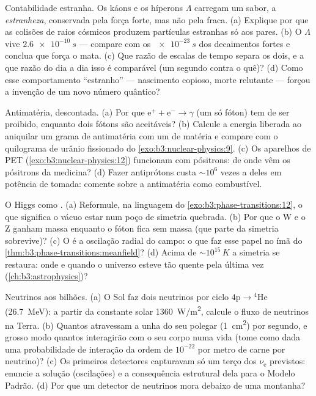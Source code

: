 \begin{exercise}[$\star\star$]\label{exo:b3:particle-physics:7}
Contabilidade estranha. Os káons e os híperons $\Lambda$ carregam um
sabor, a \emph{estranheza}, conservada pela força forte, mas
não pela fraca. (a) Explique por que as colisões de raios cósmicos
produzem partículas estranhas só aos pares. (b) O $\Lambda$ vive
$\qty{2.6e-10}{s}$ --- compare com os $\qty{e-23}{s}$ dos
decaimentos fortes e conclua que força o mata. (c) Que razão
de escalas de tempo separa os dois, e a que razão do dia a dia
isso é comparável (um segundo contra o quê)? (d) Como esse
comportamento ``estranho'' --- nascimento copioso, morte relutante ---
forçou a invenção de um novo número quântico?
\end{exercise}

\begin{exercise}[$\star\star$]\label{exo:b3:particle-physics:8}
Antimatéria, descontada. (a) Por que
$\text{e}^+ + \text{e}^- \to \gamma$ (um só fóton) tem de ser proibido,
enquanto dois fótons são aceitáveis? (b) Calcule a energia liberada ao
aniquilar um grama de antimatéria com um de matéria e
compare com o quilograma de urânio fissionado do
\cref{exo:b3:nuclear-physics:9}. (c) Os aparelhos de PET
(\cref{exo:b3:nuclear-physics:12}) funcionam com pósitrons: de onde vêm
os pósitrons da medicina? (d) Fazer antiprótons custa
$\sim10^{6}$ vezes a  deles em potência de tomada:
comente sobre a antimatéria como combustível.
\end{exercise}

\begin{exercise}[$\star\star\star$]\label{exo:b3:particle-physics:9}
O Higgs como . (a) Reformule, na linguagem do
\cref{exo:b3:phase-transitions:12}, o que significa o
vácuo estar num poço de simetria quebrada. (b) Por que o W e o Z
ganham massa enquanto o fóton fica sem massa (que parte da
simetria sobrevive)? (c) O  é a oscilação radial
do campo: o que faz esse papel no ímã do
\cref{thm:b3:phase-transitions:meanfield}? (d) Acima de
$\sim10^{15}\,\unit{K}$ a simetria se restaura: onde e quando
o universo esteve tão quente pela última vez (\cref{ch:b3:astrophysics})?
\end{exercise}

\begin{exercise}[$\star\star\star$]\label{exo:b3:particle-physics:10}
Neutrinos aos bilhões. (a) O Sol faz dois neutrinos por
ciclo $4\text{p} \to {}^4\text{He}$ (\qty{26.7}{MeV}): a partir da
constante solar \qty{1360}{W/m^2}, calcule o fluxo de neutrinos na
Terra. (b) Quantos atravessam a unha do seu polegar
(\qty{1}{cm^2}) por segundo, e grosso modo quantos interagirão
com o seu corpo numa vida (tome como dada uma probabilidade de
interação da ordem de $10^{-22}$ por metro de carne por neutrino)? (c) Os
primeiros detectores capturavam só um terço dos
$\nu_{\text{e}}$ previstos: enuncie a solução (oscilações) e a
consequência estrutural dela para o Modelo Padrão. (d) Por que um
detector de neutrinos mora debaixo de uma montanha?
\end{exercise}

